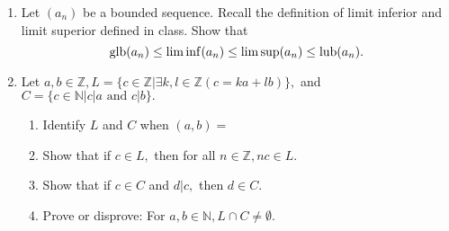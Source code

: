 \begin{enumerate}[label=(\arabic*)]
	\item Let $(a_n)$ be a bounded sequence. Recall the definition of limit inferior and limit superior defined in class. Show that
	\[\operatorname{glb}(a_n) \le \liminf(a_n) \le \limsup(a_n) \le \operatorname{lub}(a_n).\]
	\item Let $a, b \in \mathbb{Z}, L = \{c \in \mathbb{Z}|\exists k, l \in \mathbb{Z} (c = ka + lb)\},$ and $C = \{c\in\mathbb{N}| c|a \text{ and }c|b\}.$
	\begin{enumerate}[nosep] 
		\item Identify $L$ and $C$ when $(a, b) = $
		\begin{enumerate*} [label = (\arabic*)] 
			\item $(2, 3)$
			\item $(4, 6)$
			\item $(4, 8).$
		\end{enumerate*}
		\item Show that if $c \in L,$ then for all $n \in \mathbb{Z}, nc \in L.$
		\item Show that if $c \in C$ and $d|c,$ then $d \in C.$
		\item Prove or disprove: For $a, b \in \mathbb{N}, L\cap C \neq \emptyset.$
	\end{enumerate}
\end{enumerate}